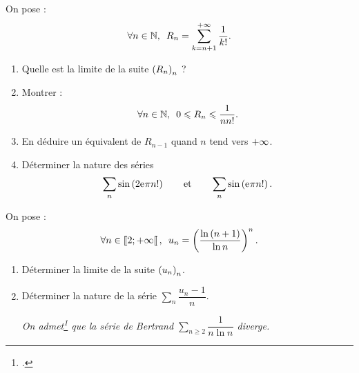\begin{corr}
\end{corr}

\begin{exo}[Exercice 14]
On pose : \[\quantifs{\forall n\in\N}R_n=\sum_{k=n+1}^{\pinf}\dfrac{1}{k!}.\]

\begin{enumerate}
\item Quelle est la limite de la suite \(\left(R_n\right)_n\) ? \\

\item Montrer : \[\quantifs{\forall n\in\N}0\leq R_n\leq\dfrac{1}{nn!}.\]

\item En déduire un équivalent de \(R_{n-1}\) quand \(n\) tend vers \(+\infty\). \\

\item Déterminer la nature des séries \[\sum_n\sin\left(2\mathrm{e}^{}\pi n!\right)\qquad\text{et}\qquad\sum_n\sin\left(\mathrm{e}^{}\pi n!\right).\]
\end{enumerate}
\end{exo}

\begin{corr}
\end{corr}

\begin{exo}
On pose : \[\quantifs{\forall n\in\interventierie{2}{\pinf}}u_n=\paren{\dfrac{\ln\paren{n+1}}{\ln n}}^n.\]

\begin{enumerate}
\item Déterminer la limite de la suite \(\left(u_n\right)_n\). \\

\item Déterminer la nature de la série \(\sum_n\dfrac{u_n-1}{n}\).

\textit{On admet\footnote{\Cf {}.} que la série de Bertrand \(\sum_{n\geq2}\dfrac{1}{n\ln n}\) diverge.}
\end{enumerate}
\end{exo}

\begin{corr}
\end{corr}

